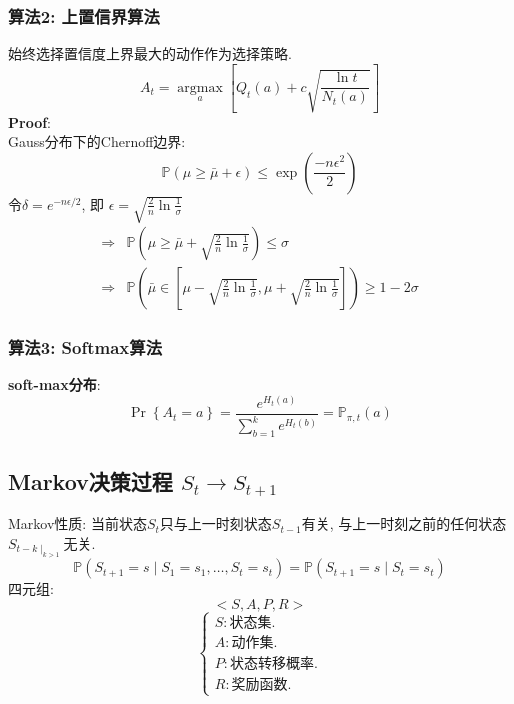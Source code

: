 \documentclass{article}
\newcommand{\env}[2]{\begin{#1}#2\end{#1}}
\begin{document}
        \subsubsection{算法2: 上置信界算法}
            始终选择置信度上界最大的动作作为选择策略.
            $$A_{t} = \underset{a}{\operatorname{argmax}}\left[Q_{t}(a)+c \sqrt{\frac{\ln t}{N_{t}(a)}}\right]$$
            \textbf{Proof}:\\
                Gauss分布下的Chernoff边界:
                    $$\mathbb{P}(\mu \geq \bar{\mu}+\epsilon) \leq \exp \left(\frac{-n \epsilon^{2}}{2}\right)$$
                令$\delta = e^{-n \epsilon / 2}$, 即 $\epsilon = \sqrt{\frac{2}{n} \ln \frac{1}{\sigma}}$
                \env{align*}{
                    \Rightarrow & \mathbb{P}\left(\mu \ge \bar{\mu} + \sqrt{\frac{2}{n} \ln \frac{1}{\sigma}} \right) \le \sigma\\
                    \Rightarrow & \mathbb{P}\left(\bar{\mu} \in \left[\mu - \sqrt{\frac{2}{n} \ln \frac{1}{\sigma}}, \mu +  \sqrt{\frac{2}{n} \ln \frac{1}{\sigma}} \right] \right) \ge 1 - 2 \sigma
                }
                
        \subsubsection{算法3: Softmax算法}
            \textbf{soft-max分布}:
                $$\operatorname{Pr}\left\{A_{t}=a\right\} = \frac{e^{H_{t}(a)}}{\sum_{b=1}^{k} e^{H_{t}(b)}} = \mathbb{P}_{\pi,t}(a)$$
    
    \subsection{Markov决策过程 $S_t \to S_{t+1}$}
        Markov性质: 当前状态$S_t$只与上一时刻状态$S_{t-1}$有关, 与上一时刻之前的任何状态$S_{t-k \mid_{k > 1}}$无关.
            $$\mathbb{P}\left(S_{t+1}=s \mid S_{1}=s_{1}, \ldots, S_{t}=s_{t}\right)=\mathbb{P}\left(S_{t+1}=s \mid S_{t}=s_{t}\right)$$
        四元组:
            $$<S, A, P, R>$$
            \begin{displaymath} \left\{ \begin{array}{l}
                S: \text{状态集.}\\
                A: \text{动作集.}\\
                P: \text{状态转移概率.}\\
                R: \text{奖励函数}.
            \end{array} \right. \end{displaymath}
            
\end{document}
